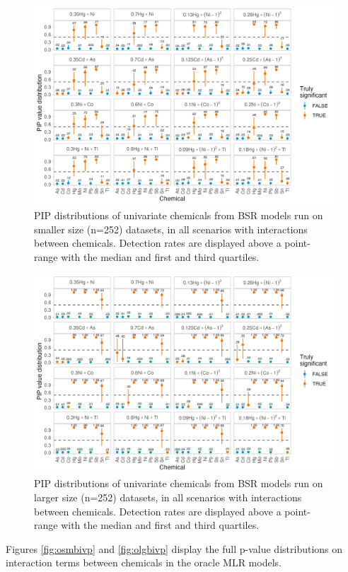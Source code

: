 \documentclass[12pt, twoside]{amherstthesis}
\begin{document}
\begin{figure}

{\centering \includegraphics[width=0.8\linewidth]{figures/ch4_ssm_univ_pips} 

}

\caption{PIP distributions of univariate chemicals from BSR models run on smaller size (n=252) datasets, in all scenarios with interactions between chemicals. Detection rates are displayed above a point-range with the median and first and third quartiles.}\label{fig:ssmunivp}
\end{figure}
\begin{figure}

{\centering \includegraphics[width=0.8\linewidth]{figures/ch4_slg_univ_pips} 

}

\caption{PIP distributions of univariate chemicals from BSR models run on larger size (n=252) datasets, in all scenarios with interactions between chemicals. Detection rates are displayed above a point-range with the median and first and third quartiles.}\label{fig:slgunivp}
\end{figure}
Figures \ref{fig:osmbivp} and \ref{fig:olgbivp} display the full p-value distributions on interaction terms between chemicals in the oracle MLR models.
\end{document}
